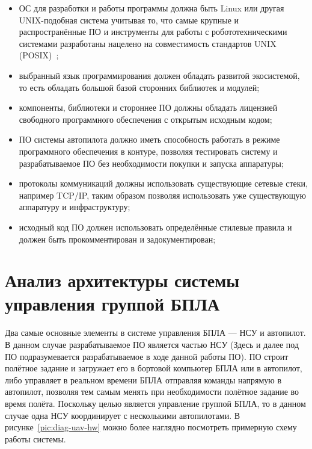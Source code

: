 \documentclass[specification,annotation]{itmo-student-thesis}
\begin{document}
\begin{itemize}
  \item ОС для разработки и работы программы должна быть Linux или другая
    UNIX-подобная система учитывая то, что самые крупные и распространённые ПО и
    инструменты для работы с робототехническими системами разработаны нацелено
    на совместимость стандартов UNIX (POSIX)~\cite{ros-documentation};
  \item выбранный язык программирования должен обладать развитой экосистемой, то
    есть обладать большой базой сторонних библиотек и модулей;
  \item компоненты, библиотеки и стороннее ПО должны обладать лицензией
    свободного программного обеспечения с открытым исходным кодом;
  \item ПО системы автопилота должно иметь способность работать в режиме
    программного обеспечения в контуре, позволяя тестировать систему и
    разрабатываемое ПО без необходимости покупки и запуска аппаратуры;
  \item протоколы коммуникаций должны использовать существующие сетевые стеки,
    например TCP/IP, таким образом позволяя использовать уже существующую
    аппаратуру и инфраструктуру;
  \item исходный код ПО должен использовать определённые стилевые правила и
    должен быть прокомментирован и задокументирован;
\end{itemize}

\section{Анализ архитектуры системы управления группой БПЛА}\label{sec:analarch}

Два самые основные элементы в системе управления БПЛА --- НСУ и автопилот. В
данном случае разрабатываемое ПО является частью НСУ (Здесь и далее под ПО
подразумевается разрабатываемое в ходе данной работы ПО). ПО строит полётное
задание и загружает его в бортовой компьютер БПЛА или в автопилот, либо
управляет в реальном времени БПЛА отправляя команды напрямую в автопилот,
позволяя тем самым менять при необходимости полётное задание во время полёта.
Поскольку целью является управление группой БПЛА, то в данном случае одна НСУ
координирует с несколькими автопилотами. В рисунке~\ref{pic:diag-uav-hw} можно
более наглядно посмотреть примерную схему работы системы.
\end{document}
